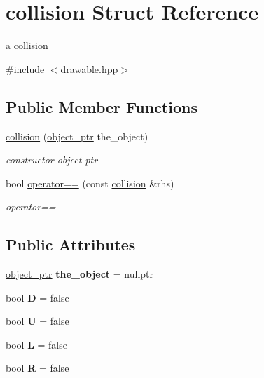 \hypertarget{structcollision}{}\section{collision Struct Reference}
\label{structcollision}


a collision  




{\ttfamily \#include $<$drawable.\+hpp$>$}

\subsection*{Public Member Functions}
\begin{DoxyCompactItemize}
\item 
\hyperlink{structcollision_a8e4d3b4a9355c8946c0ad06ccc6e8d36}{collision} (\hyperlink{drawable_8hpp_aab5add95f06d2ba25dbfed8eb07274fa}{object\+\_\+ptr} the\+\_\+object)
\begin{DoxyCompactList}\small\item\em constructor object ptr \end{DoxyCompactList}\item 
bool \hyperlink{structcollision_ab1721e643a7906b3e4319a86315fce1b}{operator==} (const \hyperlink{structcollision}{collision} \&rhs)
\begin{DoxyCompactList}\small\item\em operator== \end{DoxyCompactList}\end{DoxyCompactItemize}
\subsection*{Public Attributes}
\begin{DoxyCompactItemize}
\item 
\mbox{\label{structcollision_a7ed36890448403a8a50bf90565255e42}} 
\hyperlink{drawable_8hpp_aab5add95f06d2ba25dbfed8eb07274fa}{object\+\_\+ptr} {\bfseries the\+\_\+object} = nullptr
\item 
\mbox{\label{structcollision_a650a2bb40b437483c892b299c21920e8}} 
bool {\bfseries D} = false
\item 
\mbox{\label{structcollision_a01f73e208a2d2c858a157ab895a58509}} 
bool {\bfseries U} = false
\item 
\mbox{\label{structcollision_ae07e40f8555ca518bf68ab3d85fcdb8e}} 
bool {\bfseries L} = false
\item 
\mbox{\label{structcollision_a89956863ae123b47eaf477b785a60a58}} 
bool {\bfseries R} = false
\end{DoxyCompactItemize}


